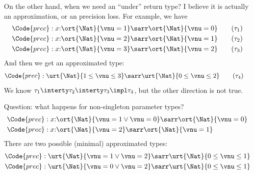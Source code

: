 On the other hand, when we need an ``under'' return type? I believe it is actually an approximation, or an precision loss. For example, we have
\begin{align*}
    \Code{prec} :\;& x{:}\ort{\Nat}{\vnu = 1} \sarr \ort{\Nat}{\vnu = 0} \tag{$\tau_1$}\label{ty-1} \\
    \Code{prec} :\;& x{:}\ort{\Nat}{\vnu = 2} \sarr \ort{\Nat}{\vnu = 1} \tag{$\tau_2$}\label{ty-2} \\
    \Code{prec} :\;& x{:}\ort{\Nat}{\vnu = 3} \sarr \ort{\Nat}{\vnu = 2} \tag{$\tau_3$}\label{ty-3}
\end{align*}\noindent
And then we get an approximated type:
\begin{align*}
    \Code{prec} :\;& \urt{\Nat}{1 \leq \vnu \leq 3} \sarr \urt{\Nat}{0 \leq \vnu \leq 2} \tag{$\tau_4$}\label{ty-4}
\end{align*}\noindent
We know $\tau_1 \interty \tau_2 \interty \tau_3 \impl \tau_4$, but the other direction is not true.

Question: what happens for non-singleton parameter types?
\begin{align*}
    \Code{prec} :\;& x{:}\ort{\Nat}{\vnu = 1 \lor \vnu = 0} \sarr \ort{\Nat}{\vnu = 0} \\
    \Code{prec} :\;& x{:}\ort{\Nat}{\vnu = 2} \sarr \ort{\Nat}{\vnu = 1}
\end{align*}\noindent
There are two possible (minimal) approximated types:
\begin{align*}
    \Code{prec} :\;& \urt{\Nat}{\vnu = 1 \lor \vnu = 2} \sarr \urt{\Nat}{0 \leq \vnu \leq 1}\\
    \Code{prec} :\;& \urt{\Nat}{\vnu = 0 \lor \vnu = 2} \sarr \urt{\Nat}{0 \leq \vnu \leq 1}
\end{align*}\noindent

